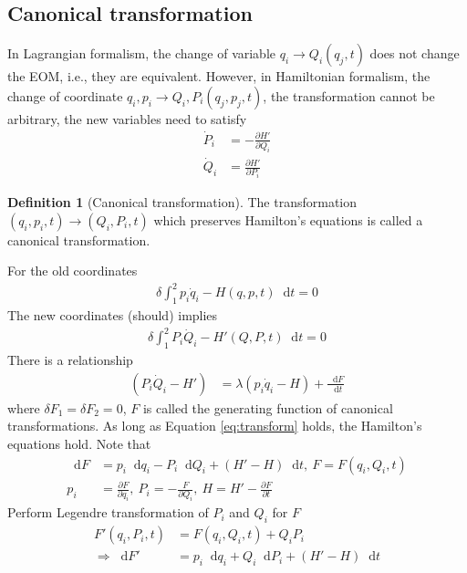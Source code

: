 \documentclass[twoside,9pt]{article}
\numberwithin{equation}{section} %
\newcommand{\lms}{\fontfamily{lmss}\selectfont} %
\renewcommand*\d{\mathop{}\!\mathrm{d}}
\theoremstyle{definition}
\newtheorem{definition}{\lms Definition}[section]
\theoremstyle{remark}
\begin{document}
\subsection{Canonical transformation}
In Lagrangian formalism, the change of variable
$q_i\rightarrow Q_i(q_j, t)$ does not change the EOM, i.e.,
they are equivalent.
However, in Hamiltonian formalism, the change of coordinate
$q_i,p_i\rightarrow Q_i, P_i(q_j, p_j, t)$, the transformation
cannot be arbitrary, the new variables need to satisfy
\begin{align}
    \dot P_i &= -\frac{\partial H'}{\partial Q_i}\\
    \dot Q_i &=  \frac{\partial H'}{\partial P_i}
\end{align}
\begin{definition}[Canonical transformation]
The transformation $(q_i,p_i,t)\rightarrow (Q_i,P_i,t)$ which preserves 
Hamilton's equations is called a canonical transformation.
\end{definition}
For the old coordinates
\begin{align}
    \delta\int_1^2 p_i\dot q_i - H(q,p,t)\d t = 0
\end{align}
The new coordinates (should) implies
\begin{align}
    \delta\int_1^2 P_i\dot Q_i - H'(Q,P,t)\d t = 0
\end{align}
There is a relationship
\begin{align}
    (P_i\dot Q_i - H') &= \lambda (p_i\dot q_i - H) + \frac{\d F}{\d t}
    \label{eq:transform}
\end{align}
where $\delta F_1 = \delta F_2 = 0$,
$F$ is called the generating function of canonical transformations.
As long as Equation \ref{eq:transform} holds, the Hamilton's equations hold.
Note that
\begin{align}
    \d F &= p_i\d q_i - P_i\d Q_i + (H' - H)\d t,~
    F = F(q_i, Q_i, t)\\
    p_i &= \frac{\partial F}{\partial q_i},~
    P_i = -\frac{F}{\partial Q_i},~
    H   = H' - \frac{\partial F}{\partial t}
\end{align}
Perform Legendre transformation of $P_i$ and $Q_i$ for $F$
\begin{align}
    F'(q_i, P_i, t) &= F(q_i, Q_i, t) + Q_iP_i\\
    \Rightarrow
    \d F' &= p_i\d q_i + Q_i\d P_i + (H' - H)\d t
\end{align}
\end{document}
